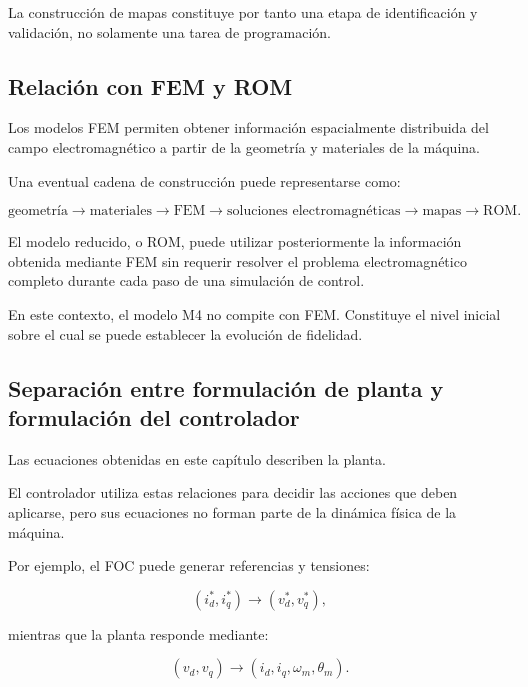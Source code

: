 La construcción de mapas constituye por tanto una etapa de identificación y validación, no solamente una tarea de programación.

\subsection{Relación con FEM y ROM}

Los modelos FEM permiten obtener información espacialmente distribuida del campo electromagnético a partir de la geometría y materiales de la máquina.

Una eventual cadena de construcción puede representarse como:

\begin{equation}
\text{geometría}
\rightarrow
\text{materiales}
\rightarrow
\text{FEM}
\rightarrow
\text{soluciones electromagnéticas}
\rightarrow
\text{mapas}
\rightarrow
\text{ROM}.
\end{equation}

El modelo reducido, o ROM, puede utilizar posteriormente la información obtenida mediante FEM sin requerir resolver el problema electromagnético completo durante cada paso de una simulación de control.

En este contexto, el modelo M4 no compite con FEM. Constituye el nivel inicial sobre el cual se puede establecer la evolución de fidelidad.

\subsection{Separación entre formulación de planta y formulación del controlador}

Las ecuaciones obtenidas en este capítulo describen la planta.

El controlador utiliza estas relaciones para decidir las acciones que deben aplicarse, pero sus ecuaciones no forman parte de la dinámica física de la máquina.

Por ejemplo, el FOC puede generar referencias y tensiones:

\begin{equation}
(i_d^\ast,i_q^\ast)
\rightarrow
(v_d^\ast,v_q^\ast),
\end{equation}

mientras que la planta responde mediante:

\begin{equation}
(v_d,v_q)
\rightarrow
(i_d,i_q,\omega_m,\theta_m).
\end{equation}

